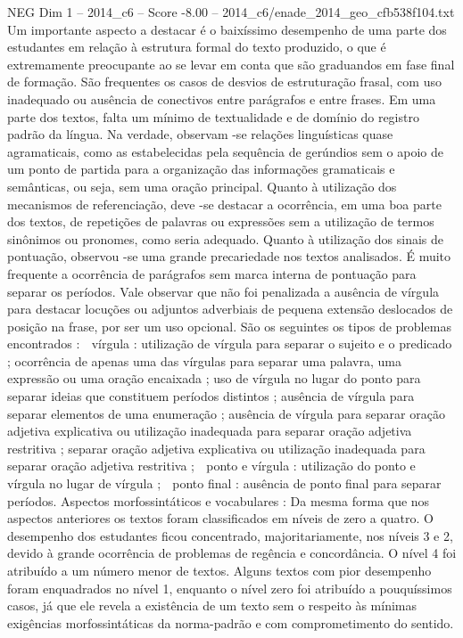 \begin{textsample}{NEG Dim 1 – 2014\_c6 – Score -8.00 – 2014\_c6/enade\_2014\_geo\_cfb538f104.txt}
Um importante aspecto a destacar é o baixíssimo desempenho de uma parte dos estudantes em relação à estrutura formal do texto produzido, o que é extremamente preocupante ao se levar em conta que são graduandos em fase final de formação.
São frequentes os casos de desvios de estruturação frasal, com uso inadequado ou ausência de conectivos entre parágrafos e entre frases.
Em uma parte dos textos, falta um mínimo de textualidade e de domínio do registro padrão da língua.
Na verdade, observam -se relações linguísticas quase agramaticais, como as estabelecidas pela sequência de gerúndios sem o apoio de um ponto de partida para a organização das informações gramaticais e semânticas, ou seja, sem uma oração principal.
Quanto à utilização dos mecanismos de referenciação, deve -se destacar a ocorrência, em uma boa parte dos textos, de repetições de palavras ou expressões sem a utilização de termos sinônimos ou pronomes, como seria adequado.
Quanto à utilização dos sinais de pontuação, observou -se uma grande precariedade nos textos analisados.
É muito frequente a ocorrência de parágrafos sem marca interna de pontuação para separar os períodos.
Vale observar que não foi penalizada a ausência de vírgula para destacar locuções ou adjuntos adverbiais de pequena extensão deslocados de posição na frase, por ser um uso opcional.
São os seguintes os tipos de problemas encontrados :  vírgula : utilização de vírgula para separar o sujeito e o predicado ; ocorrência de apenas uma das vírgulas para separar uma palavra, uma expressão ou uma oração encaixada ; uso de vírgula no lugar do ponto para separar ideias que constituem períodos distintos ; ausência de vírgula para separar elementos de uma enumeração ; ausência de vírgula para separar oração adjetiva explicativa ou utilização inadequada para separar oração adjetiva restritiva ; separar oração adjetiva explicativa ou utilização inadequada para separar oração adjetiva restritiva ;  ponto e vírgula : utilização do ponto e vírgula no lugar de vírgula ;  ponto final : ausência de ponto final para separar períodos.
Aspectos morfossintáticos e vocabulares : Da mesma forma que nos aspectos anteriores os textos foram classificados em níveis de zero a quatro.
O desempenho dos estudantes ficou concentrado, majoritariamente, nos níveis 3 e 2, devido à grande ocorrência de problemas de regência e concordância.
O nível 4 foi atribuído a um número menor de textos.
Alguns textos com pior desempenho foram enquadrados no nível 1, enquanto o nível zero foi atribuído a pouquíssimos casos, já que ele revela a existência de um texto sem o respeito às mínimas exigências morfossintáticas da norma-padrão e com comprometimento do sentido.

\end{textsample}
